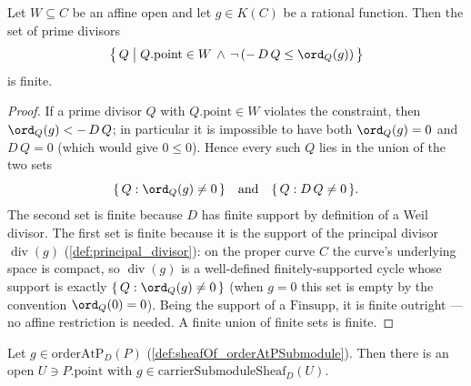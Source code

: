\begin{lemma}

  \label{lem:finite_orderConstraintFail_affine}
  Let \(W \subseteq C\) be an affine open and let \(g \in K(C)\) be a rational
  function. Then the set of prime divisors
  \[
    \bigl\{\, Q \;\big|\; Q.\mathrm{point} \in W \,\land\,
      \neg\,(-\,D\,Q \le \ord_Q(g)) \,\bigr\}
  \]
  is finite.
\end{lemma}

\begin{proof}
  \leanok
  If a prime divisor \(Q\) with \(Q.\mathrm{point} \in W\) violates the
  constraint, then \(\ord_Q(g) < -\,D\,Q\); in particular it is impossible to
  have both \(\ord_Q(g) = 0\) and \(D\,Q = 0\) (which would give \(0 \le 0\)).
  Hence every such \(Q\) lies in the union of the two sets
  \[
    \{\, Q : \ord_Q(g) \ne 0 \,\}
    \quad\text{and}\quad
    \{\, Q : D\,Q \ne 0 \,\}.
  \]
  The second set is finite because \(D\) has finite support by definition of a
  Weil divisor. The first set is finite because it is the support of the
  principal divisor \(\operatorname{div}(g)\) (\cref{def:principal_divisor}):
  on the proper curve \(C\) the curve's underlying space is compact, so
  \(\operatorname{div}(g)\) is a well-defined finitely-supported cycle whose
  support is exactly \(\{\, Q : \ord_Q(g) \ne 0 \,\}\) (when \(g = 0\) this set
  is empty by the convention \(\ord_Q(0) = 0\)). Being the support of a
  \(\mathrm{Finsupp}\), it is finite outright — no affine restriction is
  needed. A finite union of finite sets is finite.
\end{proof}

\begin{lemma}

  \label{lem:exists_open_mem_carrierSubmoduleSheaf}
  Let \(g \in \mathrm{orderAtP}_D(P)\) (\cref{def:sheafOf_orderAtPSubmodule}).
  Then there is an open \(U \ni P.\mathrm{point}\) with
  \(g \in \mathrm{carrierSubmoduleSheaf}_D(U)\).
\end{lemma}

